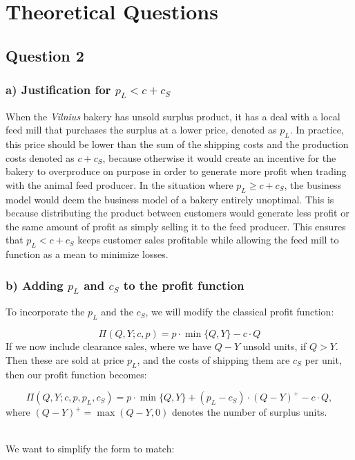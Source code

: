 \documentclass{article}
\title{}
\author{}
\date{}
\begin{document}
\section*{Theoretical Questions}
\bigskip
\subsection*{Question 2}
\bigskip

\subsubsection*{\boldmath a) Justification for $p_L < c + c_S$}
\noindent
When the \emph{Vilnius} bakery has unsold surplus product, it has a deal with a local feed mill that purchases the surplus at a lower price, denoted as $p_L$. 
In practice, this price should be lower than the sum of the shipping costs and the production costs denoted as $c + c_S$, because otherwise it would create an incentive for the bakery to overproduce on purpose in order to generate more profit when trading with the animal feed producer. In the situation where $p_L \geq c + c_S$, the business model would deem the business model of a bakery entirely unoptimal. This is because distributing the product between customers would generate less profit or the same amount of profit as simply selling it to the feed producer. This ensures that $p_L < c + c_S$ keeps customer sales profitable while allowing the feed mill to function as a mean to minimize losses.

\subsubsection*{\boldmath b) Adding $p_L$ and $c_S$ to the profit function}
\noindent 
To incorporate the $p_L$ %
and the $c_S$, %
 we will modify the classical profit function:

\[
\Pi(Q, Y; c, p) = p \cdot \min\{Q, Y\} - c \cdot Q
\]
\noindent
If we now include clearance sales, where we have $Q - Y$ unsold units, if $Q > Y$. Then these are sold at price $p_L$, and the costs of shipping them are $c_S$ per unit, then our profit function becomes:

\[
\Pi(Q, Y; c, p, p_L, c_S) = p \cdot \min\{Q, Y\} + (p_L - c_S) \cdot (Q - Y)^+ - c \cdot Q,
\]
\noindent
where $(Q - Y)^+ = \max(Q - Y, 0)$ denotes the number of surplus units.


\noindent
\\We want to simplify the form to match:
\end{document}
